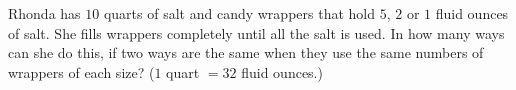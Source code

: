Rhonda has $10$ quarts of salt and candy wrappers that hold $5$, $2$ or $1$ fluid ounces of salt. She fills wrappers completely until all the salt is used. In how many ways can she do this, if two ways are the same when they use the same numbers of wrappers of each size? ($1$ quart $=32$ fluid ounces.)
